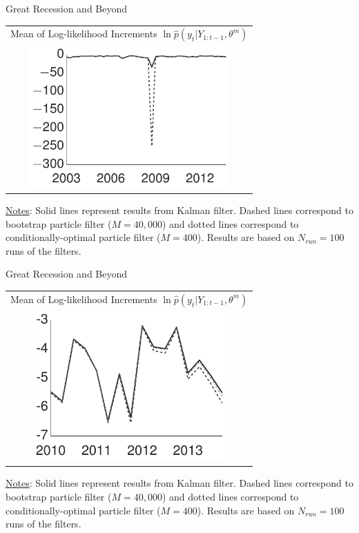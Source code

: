 \documentclass[presentation]{beamer}
\begin{document}
\begin{frame}[label={sec:org4563894}]{Great Recession and Beyond}
\begin{center}
	\begin{tabular}{c}
		Mean of Log-likelihood Increments $\ln \hat{p}(y_t|Y_{1:t-1},\theta^m)$ \\
		\includegraphics[width=3in]{dsge1_me_great_recession_lnpy.pdf} 
	\end{tabular}
\end{center}
\uline{Notes}: Solid lines represent results from Kalman
filter. Dashed lines correspond to bootstrap particle filter
(\(M=40,000\)) and dotted lines correspond to
conditionally-optimal particle filter (\(M=400\)). Results are
based on \(N_{run}=100\) runs of the filters.
\end{frame}


\begin{frame}[label={sec:org4a1ae59}]{Great Recession and Beyond}
\begin{center}
	\begin{tabular}{c}
    Mean of Log-likelihood Increments $\ln \hat{p}(y_t|Y_{1:t-1},\theta^m)$ \\
		\includegraphics[width=2.9in]{dsge1_me_post_great_recession_lnpy.pdf} 
	\end{tabular}
\end{center}
\uline{Notes}: Solid lines represent results from Kalman
filter. Dashed lines correspond to bootstrap particle filter
(\(M=40,000\)) and dotted lines correspond to
conditionally-optimal particle filter (\(M=400\)). Results are
based on \(N_{run}=100\) runs of the filters.
\end{frame}
\end{document}

